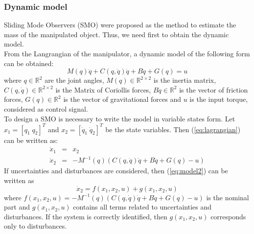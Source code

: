 \documentclass[9pt,spanish,aspectratio=1610]{beamer}
\begin{document}
\begin{frame}
\begin{columns}
\begin{column}{0.5\textwidth}
\begin{figure}
      \end{figure}
    \end{column}
  \end{columns}
\end{frame}

\begin{frame}\frametitle{Dynamic model}
  Sliding Mode Observers (SMO) were proposed as the method to estimate the mass of the manipulated object. Thus, we need first to obtain the dynamic model.\\
  From the Langrangian of the manipulator, a dynamic model of the following form can be obtained:
  \begin{equation}
    M(q)\ddot{q} + C(q, \dot{q})\dot{q} + B\dot{q} + G(q) = u
    \label{eq:lagrangian}
  \end{equation}
  where $q\in \mathbb{R}^2$ are the joint angles, $M(q)\in \mathbb{R}^{2\times 2}$ is the inertia matrix, $C(q,\dot{q})\in \mathbb{R}^{2\times 2}$ is the Matrix of Coriollis forces, $B\dot{q}\in \mathbb{R}^2$ is the vector of friction forces, $G(q)\in\mathbb{R}^2$ is the vector of gravitational forces and $u$ is the input torque, considered as control signal. \\
  To design a SMO is necessary to write the model in variable states form. Let $x_1 = [q_1\;q_2]^T$ and $x_2 = [\dot{q}_1\;\dot{q}_2]^T$ be the state variables. Then (\ref{eq:lagrangian}) can be written as:
  \begin{eqnarray}
    \dot{x}_1 &=& x_2\label{eq:model1}\\
    \dot{x}_2 &=& -M^{-1}(q)\left(C(q, \dot{q})\dot{q} + B\dot{q} + G(q) - u\right)\label{eq:model2}
  \end{eqnarray}
  If uncertainties and disturbances are considered, then (\ref{eq:model2}) can be written as
  \begin{equation}
    \dot{x}_2 = f(x_1, x_2, u) + g(x_1, x_2, u)
  \end{equation}
  where $f(x_1, x_2, u) = -M^{-1}(q)\left(C(q, \dot{q})\dot{q} + B\dot{q} + G(q) - u\right)$ is the nominal part and $g(x_1, x_2, u)$ contains all terms related to uncertainties and disturbances. If the system is correctly identified, then $g(x_1, x_2, u)$ corresponds only to disturbances. 
\end{frame}
\end{document}

